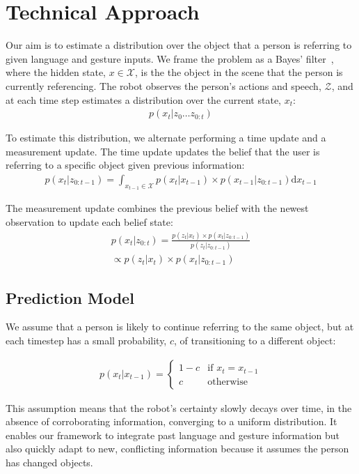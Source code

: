 \documentclass[graybox]{svmult}
\begin{document}
\section{Technical Approach}
Our aim is to estimate a distribution over the object that a person is
referring to given language and gesture inputs.  We frame the problem
as a Bayes' filter~\citep{thrun08}, where the hidden state,
$x \in \mathcal{X}$, is the the object in the scene that the person is
currently referencing. The robot observes the person's actions and
speech, $\mathcal{Z}$, and at each time step estimates a distribution
over the current state, $x_t$:
\begin{align}
  p(x_t | z_0 \dots z_{0:t})
\end{align}


To estimate this distribution, we alternate performing a time update
and a measurement update.  The time update updates the belief that the
user is referring to a specific object given previous
information:
\begin{align}
p(x_t | z_{0:t-1}) = \int_{x_{t-1} \in \mathcal{X}} p(x_t|x_{t-1})\times p(x_{t-1} | z_{0:t-1}) \text{d}x_{t-1}
\end{align}

The measurement update combines the previous belief with the newest observation to update each belief state: 
\begin{align}
p(x_t |z_{0:t}) = \frac{p(z_t | x_t) \times p(x_t | z_{0:t-1})}{p(z_t | z_{0:t-1})} \\\propto p(z_t | x_t) \times p(x_t | z_{0:t-1})
\end{align}



\subsection{Prediction Model}
We assume that a person is likely to continue referring to the same
object, but at each timestep has a small probability, $c$, of
transitioning to a different object: 

\begin{align}
p(x_t | x_{t-1}) = \left\{  \begin{array}{ll}
1-c &\mbox{if } x_t = x_{t-1}\\
c &\mbox{otherwise}
\end{array}\right.
\end{align}

This assumption means that the robot's certainty slowly decays over
time, in the absence of corroborating information, converging to a
uniform distribution.  It enables our framework to integrate past
language and gesture information but also quickly adapt to new,
conflicting information because it assumes the person has changed
objects.
\end{document}
